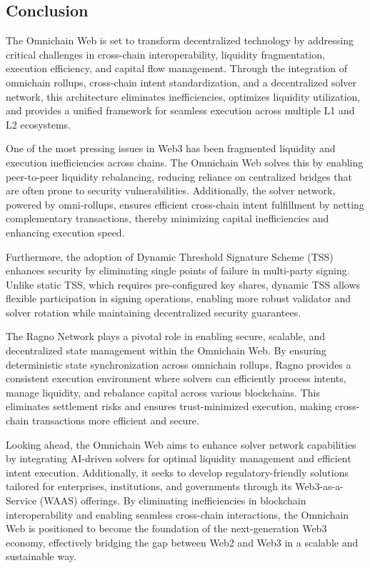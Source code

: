 \subsection{Conclusion}


The Omnichain Web is set to transform decentralized technology by addressing critical challenges in cross-chain interoperability, liquidity fragmentation, execution efficiency, and capital flow management. Through the integration of omnichain rollups, cross-chain intent standardization, and a decentralized solver network, this architecture eliminates inefficiencies, optimizes liquidity utilization, and provides a unified framework for seamless execution across multiple L1 and L2 ecosystems.  

One of the most pressing issues in Web3 has been fragmented liquidity and execution inefficiencies across chains. The Omnichain Web solves this by enabling peer-to-peer liquidity rebalancing, reducing reliance on centralized bridges that are often prone to security vulnerabilities. Additionally, the solver network, powered by omni-rollups, ensures efficient cross-chain intent fulfillment by netting complementary transactions, thereby minimizing capital inefficiencies and enhancing execution speed.  

Furthermore, the adoption of Dynamic Threshold Signature Scheme (TSS) enhances security by eliminating single points of failure in multi-party signing. Unlike static TSS, which requires pre-configured key shares, dynamic TSS allows flexible participation in signing operations, enabling more robust validator and solver rotation while maintaining decentralized security guarantees.  

The Ragno Network plays a pivotal role in enabling secure, scalable, and decentralized state management within the Omnichain Web. By ensuring deterministic state synchronization across omnichain rollups, Ragno provides a consistent execution environment where solvers can efficiently process intents, manage liquidity, and rebalance capital across various blockchains. This eliminates settlement risks and ensures trust-minimized execution, making cross-chain transactions more efficient and secure.  

  
Looking ahead, the Omnichain Web aims to enhance solver network capabilities by integrating AI-driven solvers for optimal liquidity management and efficient intent execution. Additionally, it seeks to develop regulatory-friendly solutions tailored for enterprises, institutions, and governments through its Web3-as-a-Service (WAAS) offerings. By eliminating inefficiencies in blockchain interoperability and enabling seamless cross-chain interactions, the Omnichain Web is positioned to become the foundation of the next-generation Web3 economy, effectively bridging the gap between Web2 and Web3 in a scalable and sustainable way.